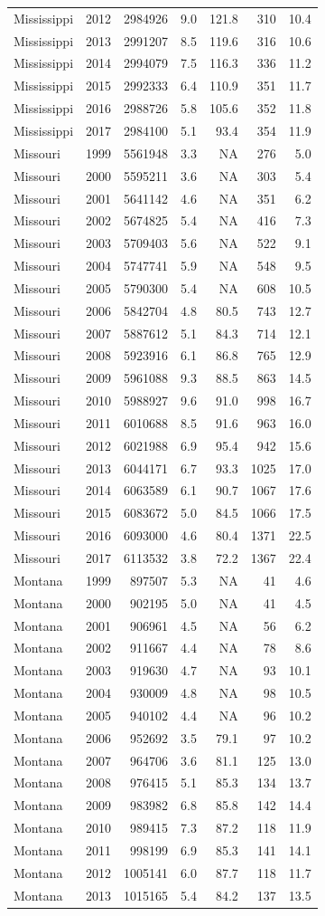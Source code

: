 \documentclass[
]{article}
\begin{document}
\begin{longtable}[]{@{}lrrrrrr@{}}
Mississippi & 2012 & 2984926 & 9.0 & 121.8 & 310 & 10.4\tabularnewline
Mississippi & 2013 & 2991207 & 8.5 & 119.6 & 316 & 10.6\tabularnewline
Mississippi & 2014 & 2994079 & 7.5 & 116.3 & 336 & 11.2\tabularnewline
Mississippi & 2015 & 2992333 & 6.4 & 110.9 & 351 & 11.7\tabularnewline
Mississippi & 2016 & 2988726 & 5.8 & 105.6 & 352 & 11.8\tabularnewline
Mississippi & 2017 & 2984100 & 5.1 & 93.4 & 354 & 11.9\tabularnewline
Missouri & 1999 & 5561948 & 3.3 & NA & 276 & 5.0\tabularnewline
Missouri & 2000 & 5595211 & 3.6 & NA & 303 & 5.4\tabularnewline
Missouri & 2001 & 5641142 & 4.6 & NA & 351 & 6.2\tabularnewline
Missouri & 2002 & 5674825 & 5.4 & NA & 416 & 7.3\tabularnewline
Missouri & 2003 & 5709403 & 5.6 & NA & 522 & 9.1\tabularnewline
Missouri & 2004 & 5747741 & 5.9 & NA & 548 & 9.5\tabularnewline
Missouri & 2005 & 5790300 & 5.4 & NA & 608 & 10.5\tabularnewline
Missouri & 2006 & 5842704 & 4.8 & 80.5 & 743 & 12.7\tabularnewline
Missouri & 2007 & 5887612 & 5.1 & 84.3 & 714 & 12.1\tabularnewline
Missouri & 2008 & 5923916 & 6.1 & 86.8 & 765 & 12.9\tabularnewline
Missouri & 2009 & 5961088 & 9.3 & 88.5 & 863 & 14.5\tabularnewline
Missouri & 2010 & 5988927 & 9.6 & 91.0 & 998 & 16.7\tabularnewline
Missouri & 2011 & 6010688 & 8.5 & 91.6 & 963 & 16.0\tabularnewline
Missouri & 2012 & 6021988 & 6.9 & 95.4 & 942 & 15.6\tabularnewline
Missouri & 2013 & 6044171 & 6.7 & 93.3 & 1025 & 17.0\tabularnewline
Missouri & 2014 & 6063589 & 6.1 & 90.7 & 1067 & 17.6\tabularnewline
Missouri & 2015 & 6083672 & 5.0 & 84.5 & 1066 & 17.5\tabularnewline
Missouri & 2016 & 6093000 & 4.6 & 80.4 & 1371 & 22.5\tabularnewline
Missouri & 2017 & 6113532 & 3.8 & 72.2 & 1367 & 22.4\tabularnewline
Montana & 1999 & 897507 & 5.3 & NA & 41 & 4.6\tabularnewline
Montana & 2000 & 902195 & 5.0 & NA & 41 & 4.5\tabularnewline
Montana & 2001 & 906961 & 4.5 & NA & 56 & 6.2\tabularnewline
Montana & 2002 & 911667 & 4.4 & NA & 78 & 8.6\tabularnewline
Montana & 2003 & 919630 & 4.7 & NA & 93 & 10.1\tabularnewline
Montana & 2004 & 930009 & 4.8 & NA & 98 & 10.5\tabularnewline
Montana & 2005 & 940102 & 4.4 & NA & 96 & 10.2\tabularnewline
Montana & 2006 & 952692 & 3.5 & 79.1 & 97 & 10.2\tabularnewline
Montana & 2007 & 964706 & 3.6 & 81.1 & 125 & 13.0\tabularnewline
Montana & 2008 & 976415 & 5.1 & 85.3 & 134 & 13.7\tabularnewline
Montana & 2009 & 983982 & 6.8 & 85.8 & 142 & 14.4\tabularnewline
Montana & 2010 & 989415 & 7.3 & 87.2 & 118 & 11.9\tabularnewline
Montana & 2011 & 998199 & 6.9 & 85.3 & 141 & 14.1\tabularnewline
Montana & 2012 & 1005141 & 6.0 & 87.7 & 118 & 11.7\tabularnewline
Montana & 2013 & 1015165 & 5.4 & 84.2 & 137 & 13.5\tabularnewline

\end{longtable}
\end{document}
